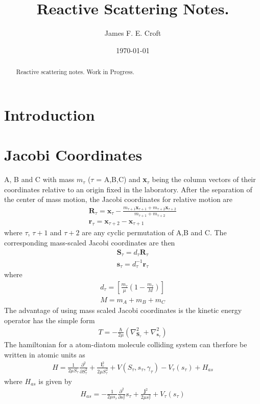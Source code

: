 \documentclass[aps,pra,onecolumn,showpacs,floatfix]{revtex4}
\begin{document}
\title{Reactive Scattering Notes.}
\author{James F. E. Croft}
\affiliation{\noaffiliation}

\date{\today}

\begin{abstract}
Reactive scattering notes. Work in Progress.
\end{abstract}

\pacs{}

\maketitle
%
\section{Introduction}
\section{Jacobi Coordinates}
A, B and C with mass $m_\tau$ ($\tau$ = A,B,C) and \textbf{x}$_\tau$ being the
column vectors of their coordinates relative to an origin fixed in the
laboratory. After the separation of the center of mass motion, the Jacobi
coordinates for relative motion are
\begin{align}\label{eqn:jac}
	\mathbf{R}_\tau = \mathbf{x}_
	\tau-\frac{m_{\tau+1} \mathbf{x}_{\tau+1}+m_{\tau+2} \mathbf{x}_{\tau+2}}{m_{\tau+1} + m_{\tau+2}} \\
	\mathbf{r}_\tau = \mathbf{x}_{\tau+2} - \mathbf{x}_{\tau+1}
\end{align}
where $\tau$, $\tau+1$ and $\tau+2$ are any cyclic permutation of A,B and C. The
corresponding mass-scaled Jacobi coordinates are then
\begin{align}\label{eqn:ms_jac}
	\mathbf{S}_\tau = d_\tau\mathbf{R}_\tau \\
	\mathbf{s}_\tau = d^{-1}_\tau\mathbf{r}_\tau
\end{align}
where
\begin{align}\label{eqn:ms_jac}
d_\tau = \left[\frac{m_\tau}{\mu}\left(1-\frac{m_\tau}{M}\right)\right] \\
M = m_A + m_B + m_C
\end{align}
The advantage of using mass scaled Jacobi coordinates is the kinetic energy
operator has the simple form
\begin{align}\label{eqn:ms_jac}
	T = -\frac{\hbar}{2\mu}(\nabla^2_{\mathbf{S}_\tau} + \nabla^2_{\mathbf{s}_\tau})
\end{align}
The hamiltonian for a atom-diatom molecule colliding system can therfore be written in
atomic units as
\begin{align}\label{eqn:ms_jac}
	H = \frac{1}{2\mu S_\tau}\frac{\partial^2}{\partial S_\tau^2}
	+ \frac{\mathbf{l}_\tau^2}{2 \mu S_\tau^2}
	  + V(S_\tau, s_\tau, \gamma_\tau)
	  - V_\tau(s_\tau)
	  + H_{as}
\end{align}
where $H_{as}$ is given by
\begin{align}\label{eqn:as_ham}
	H_{as} = -\frac{1}{2\mu s_\tau}\frac{\partial^2}{\partial s_\tau^2}s_\tau
	       + \frac{\mathbf{j}^2}{2 \mu s_\tau^2}
               + V_\tau(s_\tau)
\end{align}
\end{document}
